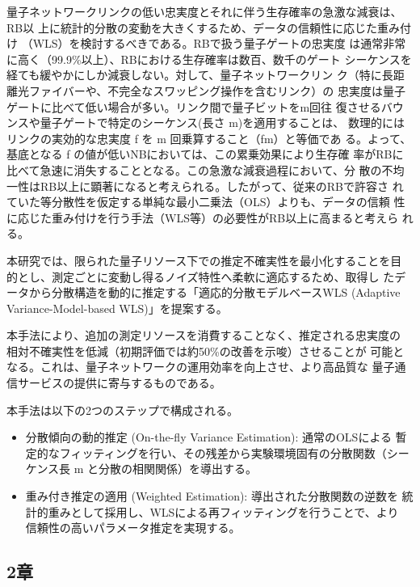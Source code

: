 \documentclass[conference]{IEEEtran}
\begin{document}
量子ネットワークリンクの低い忠実度とそれに伴う生存確率の急激な減衰は、RB以
上に統計的分散の変動を大きくするため、データの信頼性に応じた重み付け
（WLS）を検討するべきである。RBで扱う量子ゲートの忠実度
は通常非常に高く（99.9\%以上）、RBにおける生存確率は数百、数千のゲート
シーケンスを経ても緩やかにしか減衰しない。対して、量子ネットワークリン
ク（特に長距離光ファイバーや、不完全なスワッピング操作を含むリンク）の
忠実度は量子ゲートに比べて低い場合が多い。リンク間で量子ビットをm回往
復させるバウンスや量子ゲートで特定のシーケンス(長さ m)を適用することは、
数理的にはリンクの実効的な忠実度 f を m 回乗算すること（fm）と等価であ
る。よって、基底となる f の値が低いNBにおいては、この累乗効果により生存確
率がRBに比べて急速に消失することとなる。この急激な減衰過程において、分
散の不均一性はRB以上に顕著になると考えられる。したがって、従来のRBで許容さ
れていた等分散性を仮定する単純な最小二乗法（OLS）よりも、データの信頼
性に応じた重み付けを行う手法（WLS等）の必要性がRB以上に高まると考えら
れる。


本研究では、限られた量子リソース下での推定不確実性を最小化することを目
的とし、測定ごとに変動し得るノイズ特性へ柔軟に適応するため、取得し
たデータから分散構造を動的に推定する「適応的分散モデルベースWLS
(Adaptive Variance-Model-based WLS)」を提案する。

本手法により、追加の測定リソースを消費することなく、推定される忠実度の
相対不確実性を低減（初期評価では約50\%の改善を示唆）させることが
可能となる。これは、量子ネットワークの運用効率を向上させ、より高品質な
量子通信サービスの提供に寄与するものである。



本手法は以下の2つのステップで構成される。

\begin{itemize}
\item 分散傾向の動的推定 (On-the-fly Variance Estimation): 通常のOLSによる
暫定的なフィッティングを行い、その残差から実験環境固有の分散関数（シー
ケンス長 m と分散の相関関係）を導出する。

\item 重み付き推定の適用 (Weighted Estimation): 導出された分散関数の逆数を
統計的重みとして採用し、WLSによる再フィッティングを行うことで、より
信頼性の高いパラメータ推定を実現する。
\end{itemize}




\subsection*{2章}
\label{sec:org4e658c1}
\end{document}
